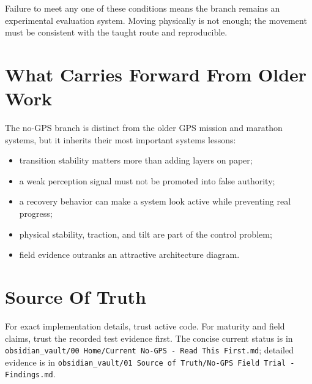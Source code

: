\documentclass[11pt]{article}
\begin{document}
Failure to meet any one of these conditions means the branch remains an
experimental evaluation system. Moving physically is not enough; the movement
must be consistent with the taught route and reproducible.

\section{What Carries Forward From Older Work}

The no-GPS branch is distinct from the older GPS mission and marathon systems,
but it inherits their most important systems lessons:

\begin{itemize}[nosep]
  \item transition stability matters more than adding layers on paper;
  \item a weak perception signal must not be promoted into false authority;
  \item a recovery behavior can make a system look active while preventing real
  progress;
  \item physical stability, traction, and tilt are part of the control problem;
  \item field evidence outranks an attractive architecture diagram.
\end{itemize}

\section{Source Of Truth}

For exact implementation details, trust active code. For maturity and field
claims, trust the recorded test evidence first. The concise current status is in
\texttt{obsidian\_vault/00 Home/Current No-GPS - Read This First.md}; detailed
evidence is in
\texttt{obsidian\_vault/01 Source of Truth/No-GPS Field Trial - Findings.md}.
\end{document}
